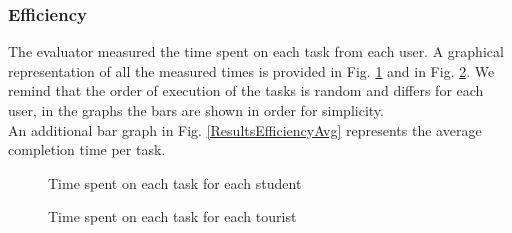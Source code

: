 \subsubsection{Efficiency}
    The evaluator measured the time spent on each task from each user. A graphical representation of all the measured times is provided in Fig. \ref{ResultsEfficiencyStudent} and in Fig. \ref{ResultsEfficiencyTourist}. We remind that the order of execution of the tasks is random and differs for each user, in the graphs the bars are shown in order for simplicity.\\
    An additional bar graph in Fig. \ref{ResultsEfficiencyAvg} represents the average completion time per task.

    \begin{figure}[!ht]
        \begin{minipage}{\linewidth}
            \centering
            \captionsetup{justification=centering}
            \caption{Time spent on each task for each student}
            \label{ResultsEfficiencyStudent}
        \end{minipage}
    \end{figure}
    \begin{figure}[!ht]
        \begin{minipage}{\linewidth}
            \centering
            \captionsetup{justification=centering}
            \caption{Time spent on each task for each tourist}
            \label{ResultsEfficiencyTourist}
        \end{minipage}
    \end{figure}


